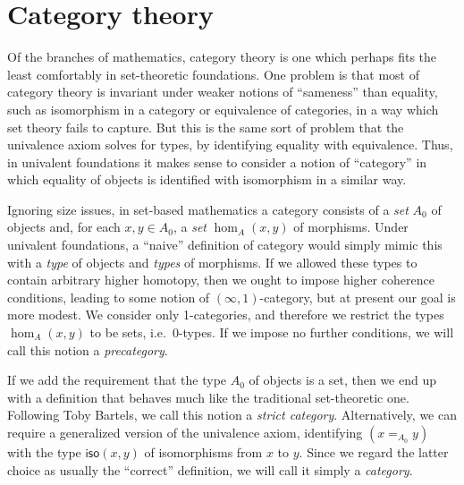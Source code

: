 \chapter{Category theory}
\label{cha:category-theory}

Of the branches of mathematics, category theory is one which perhaps fits the least comfortably in set-theoretic foundations.
One problem is that most of category theory is invariant under weaker notions of ``sameness'' than equality, such as isomorphism in a category or equivalence of categories, in a way which set theory fails to capture.
But this is the same sort of problem that the univalence axiom solves for types, by identifying equality with equivalence.
Thus, in univalent foundations it makes sense to consider a notion of ``category'' in which equality of objects is identified with isomorphism in a similar way.

Ignoring size issues, in set-based mathematics a category consists of a \emph{set} $A_0$ of objects and, for each $x,y\in A_0$, a \emph{set} $\hom_A(x,y)$ of morphisms.
Under univalent foundations, a ``naive'' definition of category would simply mimic this with a \emph{type} of objects and \emph{types} of morphisms.
If we allowed these types to contain arbitrary higher homotopy, then we ought to impose higher coherence conditions, leading to some notion of $(\infty,1)$-category,
%
but at present our goal is more modest.
We consider only 1-categories, and therefore we restrict the types $\hom_A(x,y)$ to be sets, i.e.\ 0-types.
If we impose no further conditions, we will call this notion a \emph{precategory}.

If we add the requirement that the type $A_0$ of objects is a set, then we end up with a definition that behaves much like the traditional set-theoretic one.
Following Toby Bartels, we call this notion a \emph{strict category}.
%
Alternatively, we can require a generalized version of the univalence axiom, identifying $(x=_{A_0} y)$ with the type $\mathsf{iso}(x,y)$ of isomorphisms from $x$ to $y$.
Since we regard the latter choice as usually the ``correct'' definition, we will call it simply a \emph{category}.


